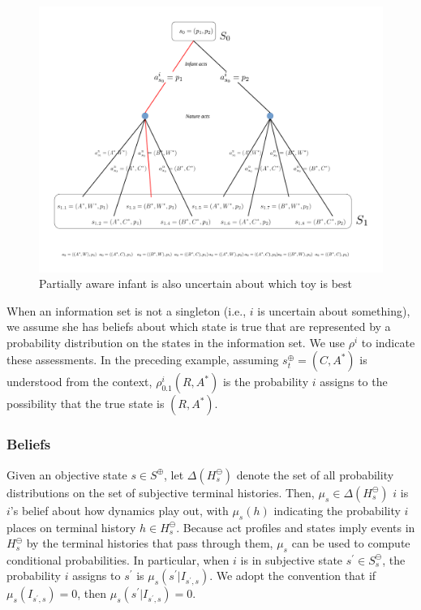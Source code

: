 \documentclass[
11pt,
titlepage,
reqno,
]{article}%
\theoremstyle{definition}
\begin{document}
\begin{figure}[h!]
	\centering
	\includegraphics*[page=3,trim = 0in 6in 6.5in 0in,scale=.8]{Awareness_Diagrams_All}
	\caption{Partially aware infant is also uncertain about which toy is best\label{Diag: p-03}}%
\end{figure}
	
When an information set is not a singleton (i.e., $i$ is uncertain about something), we assume she has beliefs about which state is true that are represented by a probability distribution on the states in the information set. 
We use $\rho^i$ to indicate these assessments. 
In the preceding example, assuming $s^\oplus_t=(C,A^\ast)$ is understood from the context, $\rho^i_{0.1}(R,A^\ast)$ is the probability $i$ assigns to the possibility that the true state is $(R,A^\ast)$.
	
\subsubsection{Beliefs} \label{sec: beliefs}
Given an objective state $s\in S^\oplus$, let $\Delta(H^\ominus_s)$ denote the set of all probability distributions on the set of subjective terminal histories. 
Then,  $\mu_s\in \Delta(H^\ominus_s)$ $i$ is $i$'s belief about how dynamics play out, with $\mu_s(h)$ indicating the probability $i$ places on terminal history $h\in H^\ominus_s$. 
Because act profiles and states imply events in $H^\ominus_s$ by the terminal histories that pass through them, $\mu_s$ can be used to compute conditional probabilities.
In particular, when $i$ is in subjective state $s^\prime\in S^\ominus_s$, the probability $i$ assigns to $s^\prime$ is  $\mu_s(s^\prime|I_{s^\prime,s})$.
We adopt the convention that if  $\mu_s(I_{s^\prime,s})=0$, then  $\mu_s(s^\prime|I_{s^\prime,s})=0$.
\end{document}
